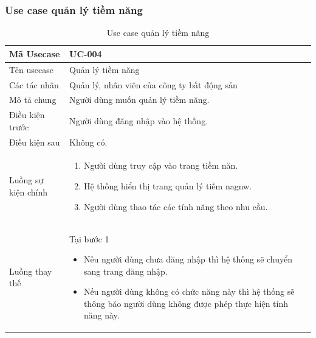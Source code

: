 \documentclass[12pt,a4paper]{article}
\begin{document}
    \subsubsection*{Use case quản lý tiềm năng}
    \begin{table}[H]
        \centering
        \begin{tabular}{|p{3.5cm}|p{11.5cm}|c|}
            \hline
            Mã Usecase      & UC-004                                      \\
            \hline
            Tên usecase     & Quản lý tiềm năng                           \\
            \hline
            Các tác nhân    & Quản lý, nhân viên của công ty bất động sản \\
            \hline
            Mô tả chung     & Người dùng muốn quản lý tiềm năng.          \\
            \hline
            Điều kiện trước & Người dùng đăng nhập vào hệ thống.          \\
            \hline
            Điều kiện sau   & Không có.                                   \\
            \hline
            Luồng sự kiện chính & \vspace{-.8cm}\begin{enumerate}
                                                    \item Người dùng truy cập vào trang tiềm năn.
                                                    \item Hệ thống hiển thị trang quản lý tiềm nagnw.
                                                    \item Người dùng thao tác các tính năng theo nhu cầu.
            \end{enumerate}
            \\
            \hline
            Luồng thay thế & Tại bước 1\newline
            \vspace{-.8cm}\begin{itemize}
                              \item Nếu người dùng chưa đăng nhập thì hệ thống sẽ chuyển sang trang đăng nhập.
                              \item Nếu người dùng không có chức năng này thì hệ thống sẽ thông báo người dùng không được phép thực hiện tính năng này.
            \end{itemize}

            \\ \hline
        \end{tabular}
        \caption{Use case quản lý tiềm năng}
    \end{table}
\end{document}
